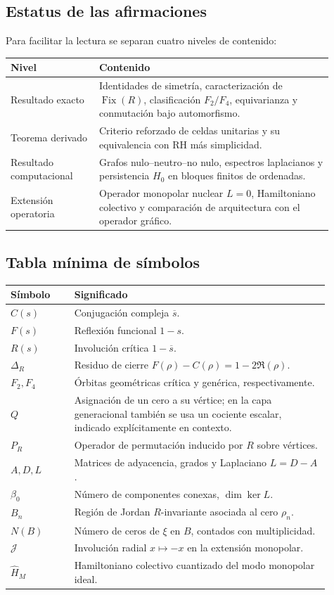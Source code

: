 \documentclass[11pt]{amsart}
\theoremstyle{definition}
\theoremstyle{remark}
\begin{document}
\subsection{Estatus de las afirmaciones}
Para facilitar la lectura se separan cuatro niveles de contenido:
\begin{center}
\begin{tabular}{p{0.25\linewidth}p{0.66\linewidth}}
\toprule
\textbf{Nivel} & \textbf{Contenido}\\
\midrule
Resultado exacto & Identidades de simetría, caracterización de $\operatorname{Fix}(R)$, clasificación $F_2/F_4$, equivarianza y conmutación bajo automorfismo.\\
Teorema derivado & Criterio reforzado de celdas unitarias y su equivalencia con RH más simplicidad.\\
Resultado computacional & Grafos nulo--neutro--no nulo, espectros laplacianos y persistencia $H_0$ en bloques finitos de ordenadas.\\
Extensión operatoria & Operador monopolar nuclear $L=0$, Hamiltoniano colectivo y comparación de arquitectura con el operador gráfico.\\
\bottomrule
\end{tabular}
\end{center}

\subsection{Tabla mínima de símbolos}
\begin{center}
\begin{tabular}{p{0.18\linewidth}p{0.72\linewidth}}
\toprule
\textbf{Símbolo} & \textbf{Significado}\\
\midrule
$C(s)$ & Conjugación compleja $\overline{s}$.\\
$F(s)$ & Reflexión funcional $1-s$.\\
$R(s)$ & Involución crítica $1-\overline{s}$.\\
$\Delta_R$ & Residuo de cierre $F(\rho)-C(\rho)=1-2\Re(\rho)$.\\
$F_2,F_4$ & Órbitas geométricas crítica y genérica, respectivamente.\\
$Q$ & Asignación de un cero a su vértice; en la capa generacional también se usa un cociente escalar, indicado explícitamente en contexto.\\
$P_R$ & Operador de permutación inducido por $R$ sobre vértices.\\
$A,D,L$ & Matrices de adyacencia, grados y Laplaciano $L=D-A$.\\
$\beta_0$ & Número de componentes conexas, $\dim\ker L$.\\
$B_n$ & Región de Jordan $R$-invariante asociada al cero $\rho_n$.\\
$N(B)$ & Número de ceros de $\xi$ en $B$, contados con multiplicidad.\\
$\mathcal J$ & Involución radial $x\mapsto -x$ en la extensión monopolar.\\
$\widehat H_M$ & Hamiltoniano colectivo cuantizado del modo monopolar ideal.\\
\bottomrule
\end{tabular}
\end{center}
\end{document}
